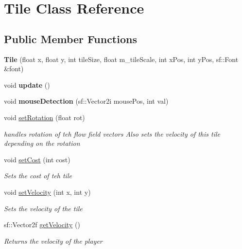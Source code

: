 \hypertarget{class_tile}{}\section{Tile Class Reference}
\label{class_tile}
\subsection*{Public Member Functions}
\begin{DoxyCompactItemize}
\item 
\mbox{\label{class_tile_a6176d4227dede77fa0e722191a7e2522}} 
{\bfseries Tile} (float x, float y, int tile\+Size, float m\+\_\+tile\+Scale, int x\+Pos, int y\+Pos, sf\+::\+Font \&font)
\item 
\mbox{\label{class_tile_a07ce694c5b16fc1c5e0a3711e682fa74}} 
void {\bfseries update} ()
\item 
\mbox{\label{class_tile_a3f0a5f2ce7a435122aaaf4e8c7916cf3}} 
void {\bfseries mouse\+Detection} (sf\+::\+Vector2i mouse\+Pos, int val)
\item 
void \mbox{\hyperlink{class_tile_ad6c3bfc01ae47ff98aba94890ce104a6}{set\+Rotation}} (float rot)
\begin{DoxyCompactList}\small\item\em handles rotation of teh flow field vectors Also sets the velocity of this tile depending on the rotation \end{DoxyCompactList}\item 
void \mbox{\hyperlink{class_tile_a25e810638e63d695b3525bc7349e50ef}{set\+Cost}} (int cost)
\begin{DoxyCompactList}\small\item\em Sets the cost of teh tile \end{DoxyCompactList}\item 
void \mbox{\hyperlink{class_tile_a0bfaf04d2c485e94225817ee87e88305}{set\+Velocity}} (int x, int y)
\begin{DoxyCompactList}\small\item\em Sets the velocity of the tile \end{DoxyCompactList}\item 
sf\+::\+Vector2f \mbox{\hyperlink{class_tile_ad2cc4a02a84288f6c68a15a8e96901ee}{get\+Velocity}} ()
\begin{DoxyCompactList}\small\item\em Returns the velocity of the player \end{DoxyCompactList}\item 

\end{DoxyCompactItemize}
